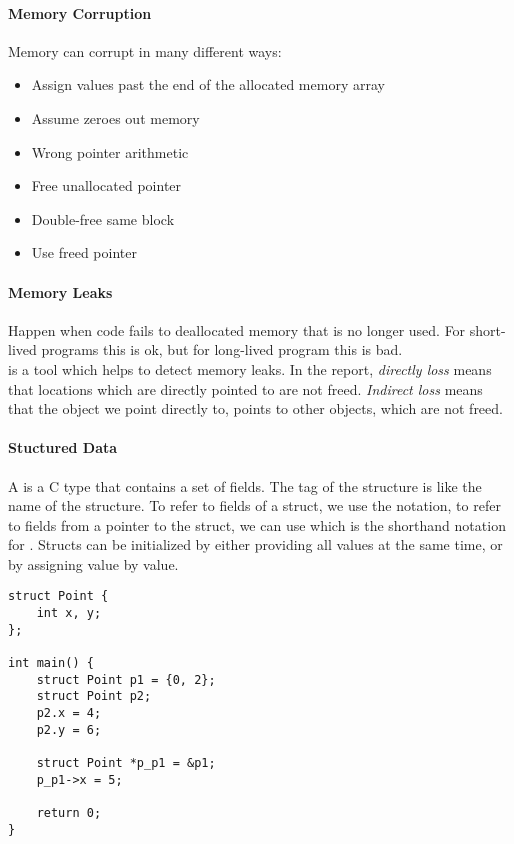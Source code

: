 \paragraph{Memory Corruption}
Memory can corrupt in many different ways:
\begin{itemize}
    \item Assign values past the end of the allocated memory array
    \item Assume  zeroes out memory
    \item Wrong pointer arithmetic
    \item Free unallocated pointer
    \item Double-free same block
    \item Use freed pointer
\end{itemize}

\paragraph{Memory Leaks}
Happen when code fails to deallocated memory that is no longer used. For short-lived programs this is ok, but for long-lived program this is bad.\\
 is a tool which helps to detect memory leaks. In the report, \textit{directly loss} means that locations which are directly pointed to are not freed. \textit{Indirect loss} means that the object we point directly to, points to other objects, which are not freed.


\paragraph{Stuctured Data}
A  is a C type that contains a set of fields. The tag of the structure is like the name of the structure. To refer to fields of a struct, we use the  notation, to refer to fields from a pointer to the struct, we can use  which is the shorthand notation for . Structs can be initialized by either providing all values at the same time, or by assigning value by value.

\begin{lstlisting}
struct Point {
    int x, y;
};

int main() {
    struct Point p1 = {0, 2};
    struct Point p2;
    p2.x = 4;
    p2.y = 6;

    struct Point *p_p1 = &p1;
    p_p1->x = 5;

    return 0;
}
\end{lstlisting}

